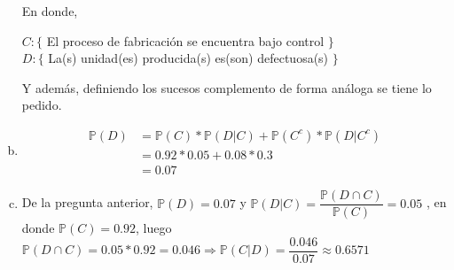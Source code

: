 \begin{solution}
\begin{enumerate}[a)]
\begin{center}
\end{center}
En donde,\\
\begin{center}
$C:\{$ El proceso de fabricación se encuentra bajo control $\}$\\
$D:\{$ La(s) unidad(es) producida(s) es(son) defectuosa(s) $\}$
\end{center}
Y además, definiendo los sucesos complemento de forma análoga se tiene lo pedido.
\newpage
\item \begin{align*}
\mathbb{P}(D)&=\mathbb{P}(C)*\mathbb{P}(D|C)+\mathbb{P}(C^c)*\mathbb{P}(D|C^c)\\
&=0.92*0.05+0.08*0.3\\
&=0.07 
\end{align*}
\item De la pregunta anterior, $\mathbb{P}(D)=0.07$ y $\mathbb{P}(D|C)=\dfrac{\mathbb{P}(D\cap C)}{\mathbb{P}(C)}=0.05$ , en donde $\mathbb{P}(C)=0.92$, luego $\mathbb{P}(D\cap C)=0.05*0.92=0.046 \Rightarrow \mathbb{P}(C|D)=\dfrac{0.046}{0.07}\approx 0.6571$ 
\end{enumerate}
\end{solution}